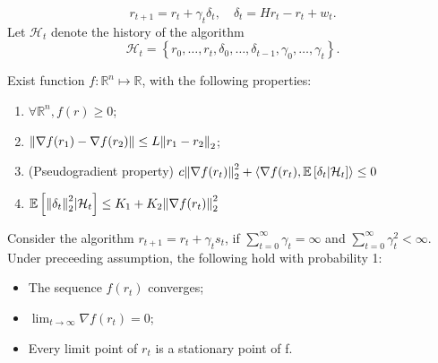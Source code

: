 \[
    r_{t+1} = r_t + \gamma_t \delta_t, \quad \delta_t = H r_t - r_t + w_t.
\]
Let $ \mathcal{H}_t $ denote the history of the algorithm
\[
    \mathcal{H}_t = \left\{ r_0, \ldots, r_t, \delta_0, \ldots, \delta_{t-1}, \gamma_0, \ldots, \gamma_t \right\}.
\]

\begin{assumption}
    Exist function $ f: \mathbb{R}^{n} \mapsto \mathbb{R} $, with the following properties:
    \begin{enumerate}
        \item $ \forall \mathbb{R}^{n}, f(r) \ge 0 $;
        \item $ \Arrowvert \nabla f(r_1) - \nabla f(r_2) \Arrowvert \le L {\Arrowvert r_1 - r_2 \Arrowvert}_2 $;
        \item (Pseudogradient property) $ c {\Arrowvert \nabla f(r_t) \Arrowvert}^2_2 + \langle \nabla f(r_t), \mathbb{E}\left[ \delta_t | \mathcal{H}_t \right] \rangle \le 0$
        \item $ \mathbb{E}\left[ {\Arrowvert \delta_t \Arrowvert}_2^2 | \mathcal{H}_t \right] \le K_1 + K_2 {\Arrowvert \nabla f(r_t) \Arrowvert}^2_2 $
    \end{enumerate}
\end{assumption}

\begin{proposition}
    Consider the algorithm $ r_{t+1} = r_{t} + \gamma_t s_t $, if $ \sum^{\infty}_{t=0} \gamma_t = \infty $ and $ \sum^{\infty}_{t=0} \gamma^{2}_t < \infty $.
    Under preceeding assumption, the following hold with probability 1:
    \begin{itemize}
        \item The sequence $ f(r_t) $ converges;
        \item $ \lim_{t \to \infty} \nabla f(r_t) = 0 $;
        \item Every limit point of $ r_t $ is a stationary point of f.
    \end{itemize}
\end{proposition}


